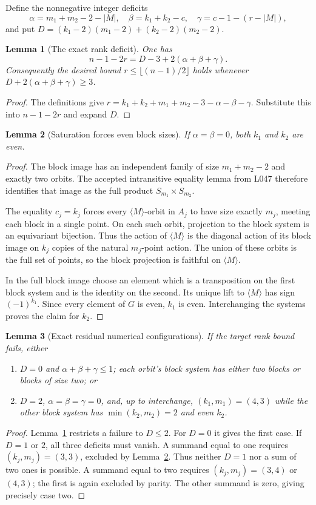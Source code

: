 \documentclass[11pt,a4paper]{article}
\newtheorem{lemma}{Lemma}
\newcommand{\gen}[1]{\langle#1\rangle}
\begin{document}
Define the nonnegative integer deficits
\[
 \alpha=m_1+m_2-2-|M|,\quad
 \beta=k_1+k_2-c,\quad
 \gamma=c-1-(r-|M|),
\]
and put $D=(k_1-2)(m_1-2)+(k_2-2)(m_2-2)$.

\begin{lemma}[The exact rank deficit]\label{deficit}
One has
\[
 n-1-2r=D-3+2(\alpha+\beta+\gamma).
\]
Consequently the desired bound $r\leq\lfloor(n-1)/2\rfloor$
holds whenever $D+2(\alpha+\beta+\gamma)\geq3$.
\end{lemma}
\begin{proof}
The definitions give
$r=k_1+k_2+m_1+m_2-3-\alpha-\beta-\gamma$.
Substitute this into $n-1-2r$ and expand $D$.
\end{proof}

\begin{lemma}[Saturation forces even block sizes]\label{parity}
If $\alpha=\beta=0$, both $k_1$ and $k_2$ are even.
\end{lemma}
\begin{proof}
The block image has an independent family of size
$m_1+m_2-2$ and exactly two orbits. The accepted intransitive
equality lemma from L047 therefore identifies that image as the
full product $S_{m_1}\times S_{m_2}$.

The equality $c_j=k_j$ forces every $\gen M$-orbit in $A_j$
to have size exactly $m_j$, meeting each block in a single point.
On each such orbit, projection to the block system is an equivariant
bijection. Thus the action of $\gen M$ is the diagonal action of
its block image on $k_j$ copies of the natural $m_j$-point action.
The union of these orbits is the full set of points, so the block
projection is faithful on $\gen M$.

In the full block image choose an element which is a transposition
on the first block system and is the identity on the second. Its
unique lift to $\gen M$ has sign $(-1)^{k_1}$. Since every element
of $G$ is even, $k_1$ is even. Interchanging the systems proves
the claim for $k_2$.
\end{proof}

\begin{lemma}[Exact residual numerical configurations]
If the target rank bound fails, either
\begin{enumerate}
\item $D=0$ and $\alpha+\beta+\gamma\leq1$; each orbit's
block system has either two blocks or blocks of size two; or
\item $D=2$, $\alpha=\beta=\gamma=0$, and, up to interchange,
$(k_1,m_1)=(4,3)$ while the other block system has
$\min(k_2,m_2)=2$ and even $k_2$.
\end{enumerate}
\end{lemma}
\begin{proof}
Lemma~\ref{deficit} restricts a failure to $D\leq2$.
For $D=0$ it gives the first case. If $D=1$ or $2$, all three
deficits must vanish. A summand equal to one requires
$(k_j,m_j)=(3,3)$, excluded by Lemma~\ref{parity}. Thus neither
$D=1$ nor a sum of two ones is possible. A summand equal to two
requires $(k_j,m_j)=(3,4)$ or $(4,3)$; the first is again excluded
by parity. The other summand is zero, giving precisely case two.
\end{proof}
\end{document}
